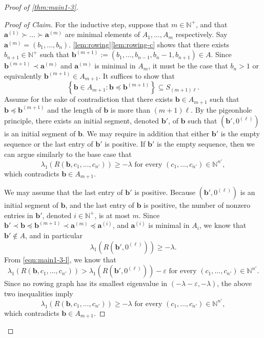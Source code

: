 \documentclass[11pt]{article}
\theoremstyle{definition}
\theoremstyle{remark}
\newenvironment{claimproof}[1][Proof]{\begin{proof}[#1]\renewcommand*{\qedsymbol}{\(\diamondsuit\)}}{\end{proof}}
\newcommand{\dset}[2]{\left\{{#1}\colon{#2}\right\}}
\newcommand{\eps}{\varepsilon}
\newcommand{\la}{\lambda}
\newcommand{\N}{\mathbb{N}}
\newcommand{\ba}{\bm{a}}
\newcommand{\bb}{\bm{b}}
\begin{document}
\begin{proof}[Proof of \cref{thm:main1-3}]
\begin{claimproof}[Proof of Claim]
        For the inductive step, suppose that $m \in \N^+$, and that $\ba^{(1)} \succ \dots \succ \ba^{(m)}$ are minimal elements of $A_1, \dots, A_m$ respectively. Say $\ba^{(m)} = (b_1, \dots, b_n)$. \cref{lem:rowing}\ref{lem:rowing-c} shows that there exists $b_{n+1} \in \N^+$ such that $\bb^{(m+1)} := (b_1, \dots, b_{n-1}, b_n-1, b_{n+1}) \in A$. Since $\bb^{(m+1)} \prec \ba^{(m)}$ and $\ba^{(m)}$ is minimal in $A_m$, it must be the case that $b_n > 1$ or equivalently $\bb^{(m+1)} \in A_{m+1}$. It suffices to show that
        \[
            \dset{\bb \in A_{m+1}}{\bb \preceq \bb^{(m+1)}} \subseteq S_{(m+1)\ell}.
        \]
        Assume for the sake of contradiction that there exists $\bb \in A_{m+1}$ such that $\bb \preceq \bb^{(m+1)}$ and the length of $\bb$ is more than $(m+1)\ell$. By the pigeonhole principle, there exists an initial segment, denoted $\bb'$, of $\bb$ such that $(\bb', 0^{(\ell)})$ is an initial segment of $\bb$. We may require in addition that either $\bb'$ is the empty sequence or the last entry of $\bb'$ is positive. If $\bb'$ is the empty sequence, then we can argue similarly to the base case that
        \[
            \la_1(R(\bb, c_1, \dots, c_{n'})) \ge -\la \text{ for every }(c_1, \dots, c_{n'}) \in \N^{n'},
        \]
        which contradicts $\bb \in A_{m+1}$.
        
        We may assume that the last entry of $\bb'$ is positive. Because $(\bb', 0^{(\ell)})$ is an initial segment of $\bb$, and the last entry of $\bb$ is positive, the number of nonzero entries in $\bb'$, denoted $i \in \N^+$, is at most $m$. Since $\bb' \prec \bb \preceq \bb^{(m+1)} \prec \ba^{(m)} \preceq \ba^{(i)}$, and $\ba^{(i)}$ is minimal in $A_i$, we know that $\bb' \not\in A$, and in particular
        \[
            \la_1(R(\bb', 0^{(\ell)})) \ge -\la.
        \]
        From \eqref{eqn:main1-3-l}, we know that
        \[
            \la_1(R(\bb, c_1, \dots, c_{n'})) > \la_1(R(\bb', 0^{(\ell)})) - \eps \text{ for every }(c_1, \dots, c_{n'}) \in \N^{n'}.
        \]
        Since no rowing graph has its smallest eigenvalue in $(-\la-\eps, -\la)$, the above two inequalities imply
        \[
            \la_1(R(\bb, c_1, \dots, c_{n'})) \ge -\la \text{ for every }(c_1, \dots, c_{n'}) \in \N^{n'},
        \]
        which contradicts $\bb \in A_{m+1}$.
    \end{claimproof}


\end{proof}
\end{document}
